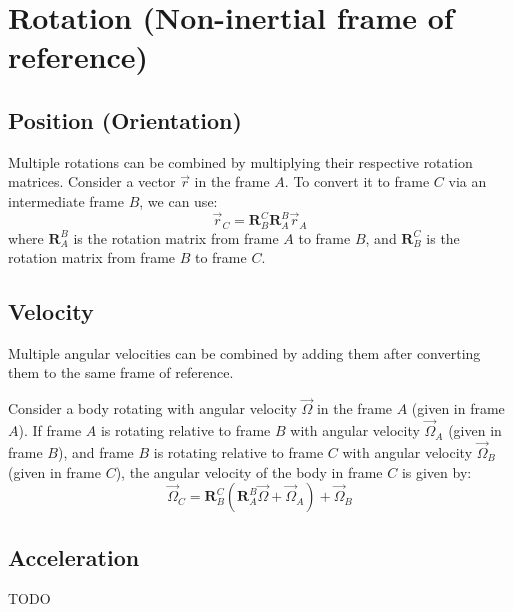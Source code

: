 \section{Rotation (Non-inertial frame of reference)}

\subsection{Position (Orientation)}
Multiple rotations can be combined by multiplying their respective rotation matrices.
Consider a vector \( \vec{r}\) in the frame \(A\).
To convert it to frame \(C\) via an intermediate frame \(B\), we can use:
\begin{equation} \nonumber
    \vec{r}_C = \mathbf{R}^C_B\mathbf{R}^B_A \vec{r}_A
\end{equation}
where \( \mathbf{R}^B_A \) is the rotation matrix from frame \(A\) to frame \(B\), and \( \mathbf{R}^C_B \) is the rotation matrix from frame \(B\) to frame \(C\).

\subsection{Velocity}
Multiple angular velocities can be combined by adding them after converting them to the same frame of reference.

Consider a body rotating with angular velocity \( \vec{\Omega}\) in the frame \(A\) (given in frame \(A\)).
If frame \(A\) is rotating relative to frame \(B\) with angular velocity \( \vec{\Omega}_A\) (given in frame \(B\)), and frame \(B\) is rotating relative to frame \(C\) with angular velocity \( \vec{\Omega}_B\) (given in frame \(C\)), the angular velocity of the body in frame \(C\) is given by:
\begin{equation} \nonumber
    \vec{\Omega}_C = \mathbf{R}^C_B \left(\mathbf{R}^B_A \vec{\Omega} + \vec{\Omega}_A \right) + \vec{\Omega}_B
\end{equation}

\subsection{Acceleration}
TODO
